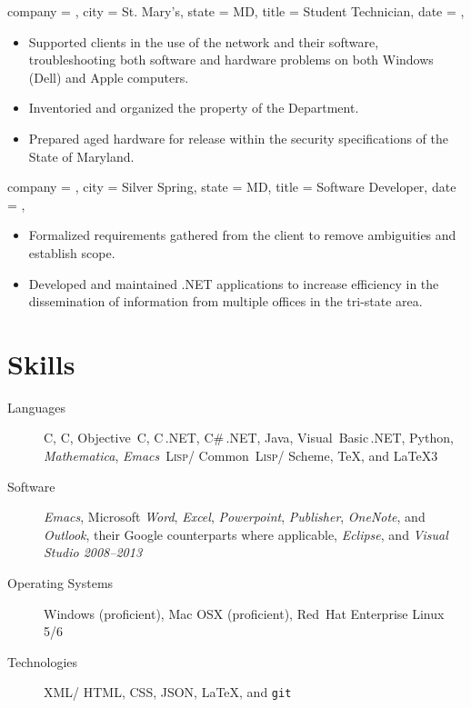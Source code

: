 \documentclass{bettercv}
\newcommand \software[1] {\textsl{#1}}
\newcommand \CPP        {{C\nolinebreak[4]\hspace{-.05em}\raisebox{.4ex}{\tiny\bf ++}}}
\newcommand \CSharp     {{C\#}}
\newcommand \Lisp       {{\textsc{Lisp}}}
\begin{document}
\begin{position}
  {
    company = \smcmoit,
    city    = St. Mary's,
    state   = MD,
    title   = Student Technician,
    date    = ,
  }

\begin{itemize}
\item Supported clients in the use of the network and their software,
  troubleshooting both software and hardware problems on both Windows (Dell) and Apple computers.
\item Inventoried and organized the property of the Department.
\item Prepared aged hardware for release within the security specifications of the State of Maryland.
\end{itemize}
\end{position}

\begin{position}
  {
    company = \cwc,
    city    = Silver Spring,
    state   = MD,
    title   = Software Developer,
    date    = ,
  }

\begin{itemize}
\item Formalized requirements gathered from the client to remove ambiguities and establish scope.
\item Developed and maintained .NET applications to increase efficiency in the dissemination of information from multiple offices in the tri-state area.
\end{itemize}
\end{position}

\section{Skills}

\begin{description}
\item[Languages]
  C,
  \CPP,
  Objective~C,
  \CPP\,.NET,
  \CSharp\,.NET,
  Java,
  Visual~Basic\,.NET,
  Python,
  \software{Mathematica},
  \software{Emacs}~\Lisp\slash
            Common~\Lisp\slash
            Scheme,
  \TeX,
  and \LaTeX3

\item[Software]
  \software{Emacs},
  Microsoft \software{Word},
            \software{Excel},
            \software{Powerpoint},
            \software{Publisher},
            \software{OneNote},
            and \software{Outlook},
  their Google counterparts where applicable,
  \software{Eclipse},
  and \software{Visual Studio 2008--2013}

\item[Operating Systems]
  Windows (proficient),
  Mac OSX (proficient),
  Red~Hat Enterprise Linux 5\slash 6

\item[Technologies]
  XML\slash
  HTML,
  CSS,
  JSON,
  \LaTeX,
  and \texttt{git}
\end{description}

\appendix
\todos
\end{document}
